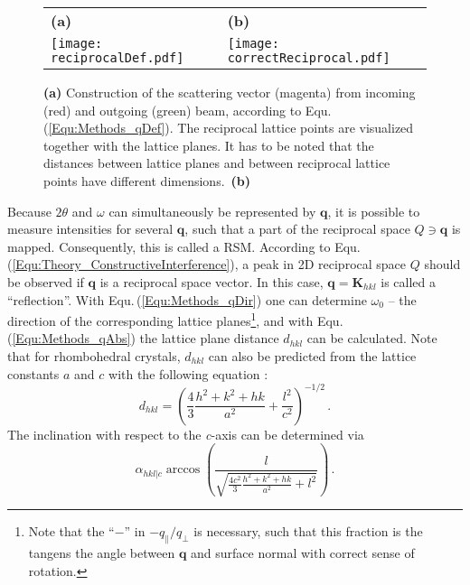 \begin{figure}
    \centering
    \begin{tabular}{ll}
        \textbf{(a)}&\textbf{(b)}\\
        \texttt{[image: reciprocalDef.pdf]}
        &\texttt{[image: correctReciprocal.pdf]}
    \end{tabular}
    \caption{\textbf{(a)} Construction of the scattering vector (magenta) from incoming (red) and outgoing (green) beam, according to Equ.\,(\ref{Equ:Methods_qDef}).
    The reciprocal lattice points are visualized together with the lattice planes.
    It has to be noted that the distances between lattice planes and between reciprocal lattice points have different dimensions.\ 
    \textbf{(b)}\tbd}
    \label{Fig:Methods_qDef}
\end{figure} 
Because $2\theta$ and $\omega$ can simultaneously be represented by $\mathbf{q}$, it is possible to measure intensities for several $\mathbf{q}$, such that a part of the reciprocal space $Q\ni\mathbf{q}$ is mapped.
Consequently, this is called a \gls{RSM}.
According to Equ.\,(\ref{Equ:Theory_ConstructiveInterference}), a peak in 2D reciprocal space $Q$ should be observed if $\mathbf{q}$ is a reciprocal space vector.
In this case, $\mathbf{q}=\mathbf{K}_{hkl}$ is called a \enquote{reflection}.
With Equ.\,(\ref{Equ:Methods_qDir}) one can determine $\omega_0$ -- the direction of the corresponding lattice planes\footnote{
    Note that the \enquote{$-$} in $-q_\parallel/q_\perp$ is necessary, such that this fraction is the tangens the angle between $\mathbf{q}$ and surface normal with correct sense of rotation. 
}, and with Equ.\,(\ref{Equ:Methods_qAbs}) the lattice plane distance $d_{hkl}$ can be calculated.
Note that for rhombohedral crystals, $d_{hkl}$ can also be predicted from the lattice constants $a$ and $c$ with the following equation \cite{grundmann2018}:
\begin{equation}
    d_{hkl}=\left(
        \frac{4}{3}\frac{h^2+k^2+hk}{a^2}
        +\frac{l^2}{c^2}
    \right)^{-1/2}\,.
    \label{Equ:Methods_dhkl}
\end{equation}
The inclination with respect to the \textit{c}-axis can be determined via \cite{grundmann2020b}
\begin{equation}
    \alpha_{hkl|c}
    \arccos\left(
        \frac{l}{\sqrt{
            \frac{4c^2}{3}\frac{h^2+k^2+hk}{a^2}+l^2
        }}
    \right)\,.
    \label{Equ:Methods_angleWRTc}
\end{equation}



